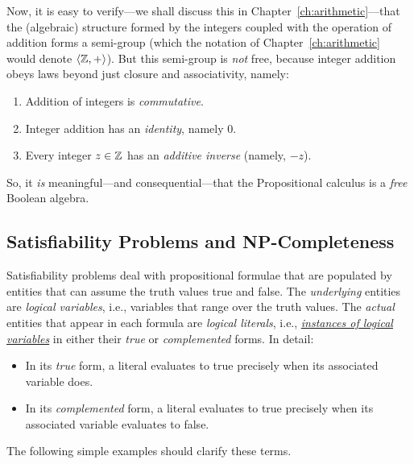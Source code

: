Now, it is easy to verify---we shall discuss this in Chapter~\ref{ch:arithmetic}---that the (algebraic) structure formed by the integers coupled with the operation of addition forms a semi-group (which the notation of Chapter~\ref{ch:arithmetic} would denote $\langle \mathbb{Z}, + \rangle$).  But this semi-group is {\em not} free, because integer addition obeys laws beyond just closure and associativity, namely:
\begin{enumerate}
\item
Addition of integers is {\em commutative}.
\item
Integer addition has an {\em identity}, namely $0$.
\item
Every integer $z \in \mathbb{Z}$ has an {\it additive inverse} (namely, $-z$).
\end{enumerate}

So, it {\em is} meaningful---and consequential---that the Propositional calculus is a {\em free} Boolean algebra.


\subsection{Satisfiability Problems and {\sf NP}-Completeness}
\label{sec:Satisfiability}


Satisfiability problems deal with propositional formulae that are populated by entities that can assume the truth values {\sc true} and {\sc false}.  The {\em underlying} entities are {\it logical variables}, i.e., variables that range over the truth values.  The {\em actual} entities that appear in each formula are {\it logical literals}, i.e., \underline{\em instances of logical variables} in either their {\em true} or {\em complemented} forms.  In detail:
\begin{itemize}
\item
In its {\em true} form, a literal evaluates to {\sc true} precisely when its associated variable does.
\item
In its {\em complemented} form, a literal evaluates to {\sc true} precisely when its associated variable evaluates to {\sc false}.
\end{itemize}
The following simple examples should clarify these terms.

